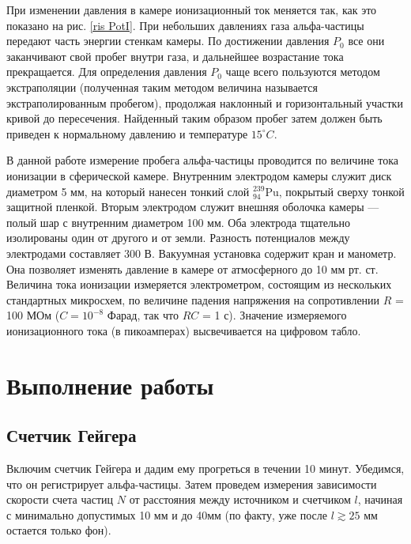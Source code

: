 \documentclass[12pt]{kiarticle}
\begin{document}
	При изменении давления в камере ионизационный ток меняется так, как это показано на рис. \ref{ris PotI}. При небольших давлениях газа
	альфа-частицы передают часть энергии стенкам камеры. По достижении
	давления $ P_0 $ все они заканчивают свой пробег внутри газа, и дальнейшее возрастание тока прекращается. Для определения давления $ P_0 $ чаще всего пользуются методом экстраполяции (полученная таким методом величина называется экстраполированным пробегом), продолжая наклонный и горизонтальный участки кривой до пересечения. Найденный таким образом пробег затем должен быть приведен к нормальному давлению и температуре $ 15 ^\circ C $.
	
	В данной работе измерение пробега альфа-частицы проводится по величине тока ионизации в сферической камере. Внутренним электродом
	камеры служит диск диаметром 5 мм, на который нанесен тонкий слой $ ^{239}_{94} $Pu, покрытый сверху тонкой защитной пленкой. Вторым электродом служит внешняя оболочка камеры --- полый шар с внутренним
	диаметром 100 мм. Оба электрода тщательно изолированы один от
	другого и от земли. Разность потенциалов между электродами составляет 300 В. Вакуумная установка содержит кран и манометр. Она позволяет изменять давление в камере от атмосферного до 10 мм рт. ст.
	Величина тока ионизации измеряется электрометром, состоящим из
	нескольких стандартных микросхем, по величине падения напряжения
	на сопротивлении $ R $ = 100 МОм ($ C = 10^{-8} $ Фарад, так что $ RC $ = 1 с).
	Значение измеряемого ионизационного тока (в пикоамперах) высвечивается на цифровом табло.
	
	
	
	
	
	\section{Выполнение работы}
	
		\subsection{Счетчик Гейгера}
		
		Включим счетчик Гейгера и дадим ему прогреться в течении 10 минут. Убедимся, что он регистрирует альфа-частицы. Затем проведем измерения зависимости скорости счета частиц $ N $ от расстояния между источником и счетчиком $ l $, начиная с минимально допустимых 10 мм и до 40мм (по факту, уже после $ l \gtrsim 25 $ мм остается только фон).
		
\end{document}
